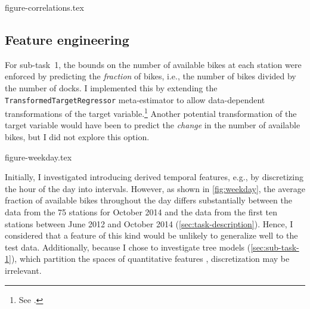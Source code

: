 {figure-correlations.tex}

\subsection{Feature engineering}
\label{sec:feature-engineering}

For sub-task~1, the bounds on the number of available bikes at each station were
enforced by predicting the \emph{fraction} of bikes, i.e., the number of bikes divided
by the number of docks.
I implemented this by extending the \texttt{TransformedTargetRegressor} meta-estimator
to allow data-dependent transformations of the target variable.\footnote{See
  .
}
Another potential transformation of the target variable would have been to predict the
\emph{change} in the number of available bikes, but I did not explore this option.

{figure-weekday.tex}

Initially, I investigated introducing derived temporal features, e.g., by discretizing
the hour of the day into intervals.
However, as shown in \cref{fig:weekday}, the average fraction of available bikes
throughout the day differs substantially between the data from the 75 stations for
October 2014 and the data from the first ten stations between June 2012 and October
2014 (\cref{sec:task-description}).
Hence, I considered that a feature of this kind would be unlikely to generalize well to
the test data.
Additionally, because I chose to investigate tree models (\cref{sec:sub-task-1}), which
partition the spaces of quantitative features \parencite[155]{Flach2012},
discretization may be irrelevant.
